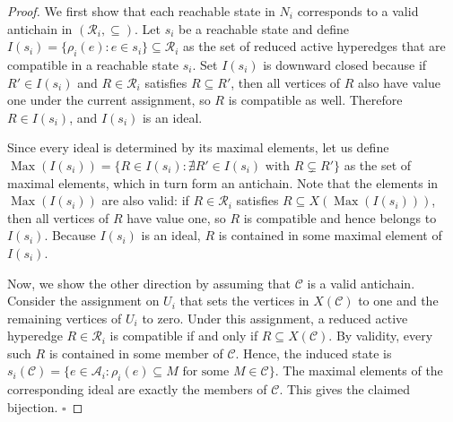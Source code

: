 \documentclass[10pt,a4paper]{amsart}
\newcommand{\A}{\mathcal{A}}
\newcommand{\C}{\mathcal{C}}
\newcommand{\R}{\mathcal{R}}
\begin{document}
\begin{proof}
We first show that each reachable state in $N_i$ corresponds to a valid antichain in $(\R_i,\subseteq)$. Let $s_i$ be a reachable state and define $I(s_i)=\{\rho_i(e):e\in s_i\}\subseteq\R_i$ as the set of reduced active hyperedges that are compatible in a reachable state $s_i$. Set $I(s_i)$ is downward closed because if $R'\in I(s_i)$ and $R\in\R_i$ satisfies $R\subseteq R'$, then all vertices of $R$ also have value one under the current assignment, so $R$ is compatible as well. Therefore $R\in I(s_i)$, and $I(s_i)$ is an ideal.

Since every ideal is determined by its maximal elements, let us define
$
\operatorname{Max}(I(s_i)) = \{R\in I(s_i): \nexists R'\in I(s_i)\text{ with }R\subsetneq R'\}
$
as the set of maximal elements, which in turn form an antichain. Note that the elements in $\operatorname{Max}(I(s_i))$ are also valid: if
$R\in\R_i$ satisfies $R\subseteq X(\operatorname{Max}(I(s_i)))$, then all
vertices of $R$ have value one, so $R$ is compatible and hence belongs to $I(s_i)$. Because $I(s_i)$ is an ideal, $R$ is contained in some maximal element of $I(s_i)$.

Now, we show the other direction by assuming that $\C$ is a valid antichain. Consider the assignment on $U_i$ that sets the vertices in $X(\C)$ to one and the remaining vertices of $U_i$ to zero. Under this assignment, a reduced active hyperedge $R\in\R_i$ is
compatible if and only if $R\subseteq X(\C)$. By validity, every such $R$ is
contained in some member of $\C$. Hence, the induced state is
$
s_i(\C)=
\{e\in\A_i :
\rho_i(e)\subseteq M \text{ for some } M\in\C\}.
$
The maximal elements of the corresponding ideal are exactly the members of
$\C$. This gives the claimed bijection. \hfill$\square$
\end{proof}
\end{document}
